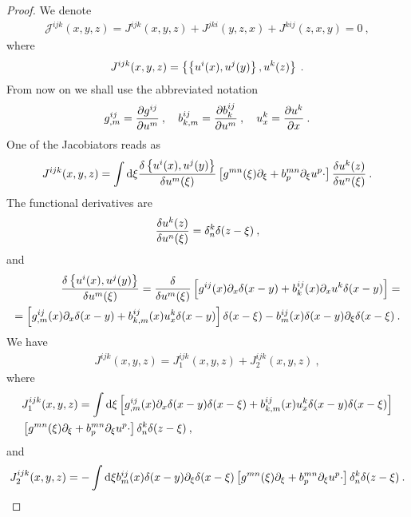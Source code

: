 \begin{proof}
    We denote
    \begin{align}
        \mathcal J^{ijk}(x,y,z) = J^{ijk}(x,y,z)+ J^{jki}(y,z,x)+ J^{kij}(z,x,y) = 0 \:,
    \end{align}
    where
    \begin{align}
        J^{ijk}(x,y,z) = \left \lbrace \left \lbrace u^i(x),u^j(y) \right \rbrace, u^k(z) \right \rbrace \:.
    \end{align}
    From now on we shall use the abbreviated notation
    \begin{align}
        g^{ij}_{,m} = \frac{\partial g^{ij}}{\partial u^m} \:, \quad b^{ij}_{k,m} = \frac{\partial b^{ij}_k}{\partial u^m} \:, \quad u^k_x = \frac{\partial u^k}{\partial x}  \:.
    \end{align}
    One of the Jacobiators reads as
    \begin{align*}
        J^{ijk}(x,y,z) =
        \int \mathrm{d} \xi \frac{\delta \left \lbrace u^i(x),u^j(y) \right \rbrace}{\delta u^m(\xi)} 
        \left[ g^{mn}(\xi) \partial_\xi + b^{mn}_p \partial_\xi u^p \cdot \right] \frac{\delta u^k(z)}{\delta u^n(\xi)}  \:.
    \end{align*}
    The functional derivatives are
    \begin{align}
        \frac{\delta u^k(z)}{\delta u^n(\xi)} = \delta^k_n \delta(z-\xi) \:,
    \end{align}
    and 
    \begin{align}
        \frac{\delta \left \lbrace u^i(x),u^j(y) \right \rbrace}{\delta u^m(\xi)} = \frac{\delta }{\delta u^m(\xi)} \left[ g^{ij}(x) \partial_x \delta(x-y) + b^{ij}_k(x) \partial_x u^k \delta(x-y)\right] = 
        \nonumber
        \\ = \left[ g^{ij}_{,m}(x) \partial_x \delta(x-y) + b^{ij}_{k,m}(x) u^k_x \delta(x-y) \right] \delta (x-\xi) - b^{ij}_m(x) \delta(x-y) \partial_\xi \delta(x-\xi) \:.
    \end{align}
    We have
    \begin{align}
        J^{ijk}(x,y,z) = J_1^{ijk}(x,y,z) + J_2^{ijk}(x,y,z) \:,
    \end{align}
    where
    \begin{align*}
        & J_1^{ijk}(x,y,z) = \int \mathrm{d} \xi  \left[ g^{ij}_{,m}(x) \partial_x \delta(x-y) \delta(x-\xi) + b^{ij}_{k,m}(x) u^k_x \delta(x-y) \delta(x-\xi) \right]   \\ 
        & \left[ g^{mn}(\xi) \partial_\xi + b^{mn}_p \partial_\xi u^p \cdot \right] \delta^k_n \delta(z-\xi)  \:, 
    \end{align*}
    and 
    \begin{align*}
        J_2^{ijk}(x,y,z) = - \int \D \xi b^{ij}_m(x) \delta(x-y) \partial_\xi \delta(x-\xi) \left[ g^{mn}(\xi) \partial_\xi + b^{mn}_p \partial_\xi u^p \cdot \right] \delta^k_n \delta(z-\xi)  \:.

\end{align*}
\end{proof}
